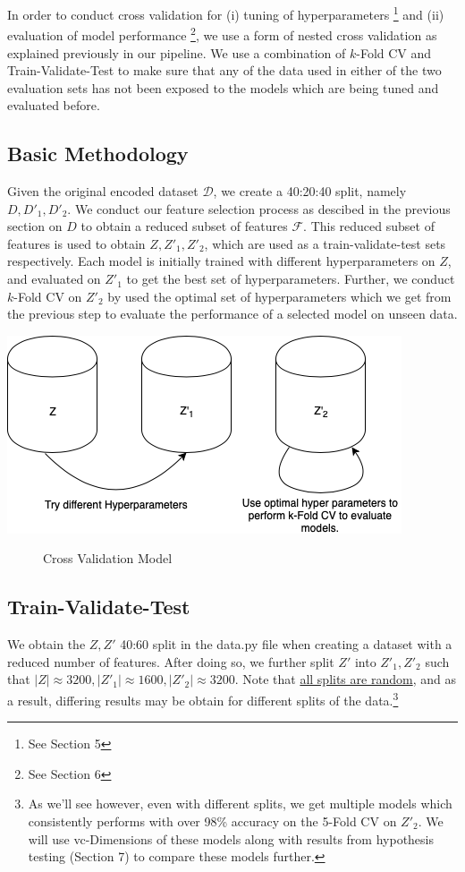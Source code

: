 \documentclass[fleqn]{article}
\begin{document}
    In order to conduct cross validation for (i) tuning of hyperparameters
    \footnote{See Section 5} and (ii) evaluation of model performance \footnote{See Section 6},
    we use a form of nested cross validation as explained previously in our pipeline. We
    use a combination of $k$-Fold CV and Train-Validate-Test to make sure that any of the
    data used in either of the two evaluation sets has not been exposed to the models
    which are being tuned and evaluated before.

    \subsection{Basic Methodology}
    Given the original encoded dataset $ \mathcal{D} $, we create a 40:20:40 split,
    namely $ D, D'_1, D'_2 $. We conduct our feature selection process as descibed in the
    previous section on $ D $ to obtain a reduced subset of features $ \mathcal{F} $.
    This reduced subset of features is used to obtain $ Z, Z'_1, Z'_2 $, which are used
    as a train-validate-test sets respectively. Each model is initially trained with
    different hyperparameters on $ Z $, and evaluated on $ Z'_1 $ to get the best set of
    hyperparameters. Further, we conduct $k$-Fold CV on $ Z'_2 $ by used the optimal set of
    hyperparameters which we get from the previous step to evaluate the performance of a
    selected model on unseen data.

    \begin{center}
        \includegraphics[scale=0.4]{tvt.png}
        \begin{figure}[!h]
            \caption{Cross Validation Model}
        \end{figure}
    \end{center}

    \subsection{Train-Validate-Test}
    We obtain the $ Z, Z' $ 40:60 split in the data.py file when creating a dataset
    with a reduced number of features. After doing so, we further split $ Z' $ into
    $ Z'_1, Z'_2 $ such that $ |Z| \approx 3200, |Z'_1| \approx 1600, |Z'_2| \approx 3200 $.
    Note that \underline{all splits are random}, and as a result, differing
    results may be obtain for different splits of the data.\footnote{As we'll see however,
    even with different splits, we get multiple models which consistently performs with
    over 98\% accuracy on the 5-Fold CV on $ Z'_2 $. We will use vc-Dimensions of these
    models along with results from hypothesis testing (Section 7) to compare these models
    further.}
\end{document}

